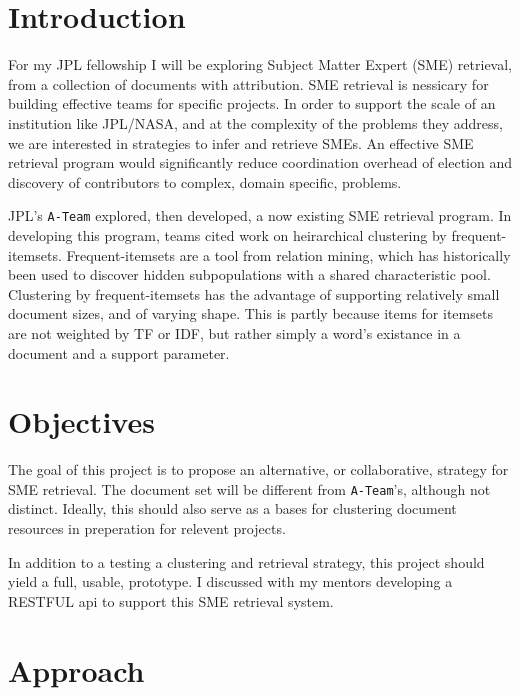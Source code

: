 \documentclass{article}
\begin{document}
\begin{multicols}{2}

\section{Introduction}

For my JPL fellowship I will be exploring Subject Matter Expert (SME) retrieval,
from a collection of documents with attribution. SME retrieval is nessicary for
building effective teams for specific projects. In order to support the scale of an
institution like JPL/NASA, and at the complexity of the problems they address, we are
interested in strategies to infer and retrieve SMEs. An effective SME retrieval program
would significantly reduce coordination overhead of election and discovery of
contributors to complex, domain specific, problems.

JPL's \texttt{A-Team} explored, then developed, a now existing SME retrieval program.
In developing this program, teams cited work on heirarchical clustering by
frequent-itemsets\cite{wang2003,kiran2010}. Frequent-itemsets\cite{Agrawal1993} are a
tool from relation mining, which has historically been used to discover hidden
subpopulations with a shared characteristic pool. Clustering by frequent-itemsets has the
advantage of supporting relatively small document sizes, and of varying shape. This is
partly because items for itemsets are not weighted by TF or IDF, but rather simply
a word's existance in a document and a support parameter.

\section{Objectives}

The goal of this project is to propose an alternative, or collaborative, strategy for
SME retrieval. The document set will be different from \texttt{A-Team}'s, although
not distinct. Ideally, this should also serve as a bases for clustering document
resources in preperation for relevent projects.

In addition to a testing a clustering and retrieval strategy, this project should yield
a full, usable, prototype. I discussed with my mentors developing a RESTFUL api to support
this SME retrieval system.

\section{Approach}


\end{multicols}
\end{document}
